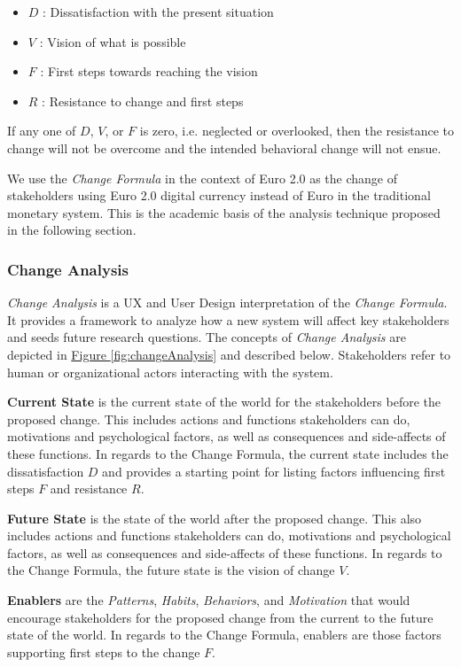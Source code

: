 \documentclass[12pt]{article} %
\newcommand{\hyperfigureref}[1]{\hyperref[#1]{Figure \ref{#1}}}
\begin{document}
{\begin{itemize}
	\item $D$ : Dissatisfaction with the present situation
	\item $V$ : Vision of what is possible
	\item $F$ : First steps towards reaching the vision
	\item $R$ : Resistance to change and first steps
\end{itemize}

If any one of $D$, $V$, or $F$ is zero, i.e. neglected or overlooked, then the resistance to change will not be overcome and the intended behavioral change will not ensue.

We use the \textit{Change Formula} in the context of Euro 2.0 as the change of stakeholders using Euro 2.0 digital currency instead of Euro in the traditional monetary system. This is the academic basis of the analysis technique proposed in the following section.

\subsubsection{Change Analysis} \label{sssec:4.2:changeAnalysis}

\textit{Change Analysis} is a UX and User Design interpretation of the \textit{Change Formula}. It provides a framework to analyze how a new system will affect key stakeholders and seeds future research questions. The concepts of \textit{Change Analysis} are depicted in \hyperfigureref{fig:changeAnalysis} and described below. Stakeholders refer to human or organizational actors interacting with the system.

\textbf{Current State} is the current state of the world for the stakeholders before the proposed change. This includes actions and functions stakeholders can do, motivations and psychological factors, as well as consequences and side-affects of these functions. In regards to the Change Formula, the current state includes the dissatisfaction $D$ and provides a starting point for listing factors influencing first steps $F$ and resistance $R$.

\textbf{Future State} is the state of the world after the proposed change. This also includes actions and functions stakeholders can do, motivations and psychological factors, as well as consequences and side-affects of these functions. In regards to the Change Formula, the future state is the vision of change $V$.

\textbf{Enablers} are the \textit{Patterns}, \textit{Habits}, \textit{Behaviors}, and \textit{Motivation} that would encourage stakeholders for the proposed change from the current to the future state of the world. In regards to the Change Formula, enablers are those factors supporting first steps to the change $F$.

}
\end{document}
